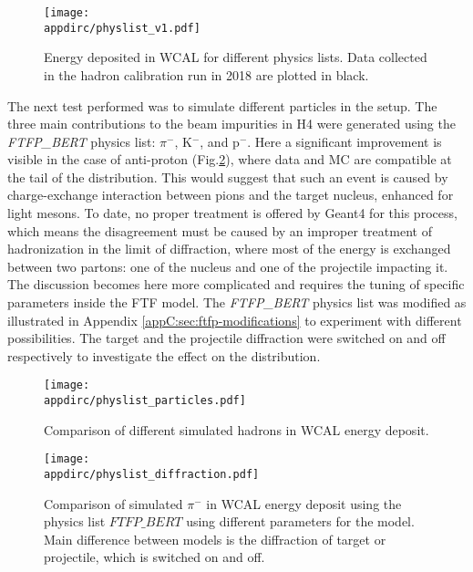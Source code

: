 \begin{figure}[tbh!]
  \centering
  \texttt{[image: \\appdirc/physlist\_v1.pdf]}
  \caption[Comparison of physics list for $\pi^-$ in WCAL energy spectrum]{Energy deposited in WCAL for different physics lists. Data collected in the hadron calibration run in 2018 are plotted in black.}
  \label{fig:geant4-hadron-plist}
\end{figure}

The next test performed was to simulate different particles in the setup. The three main contributions to the beam impurities in H4 were generated using the \textit{FTFP\_BERT} physics list: $\pi^-$, K$^-$, and p$^-$. Here a significant improvement is visible in the case of anti-proton (Fig.\ref{fig:geant4-hadron-particles}), where data and MC are compatible at the tail of the distribution. This would suggest that such an event is caused by charge-exchange interaction between pions and the target nucleus, enhanced for light mesons. To date, no proper treatment is offered by Geant4 for this process, which means the disagreement must be caused by an improper treatment of hadronization in the limit of diffraction, where most of the energy is exchanged between two partons: one of the nucleus and one of the projectile impacting it. The discussion becomes here more complicated and requires the tuning of specific parameters inside the FTF model.  The \textit{FTFP\_BERT} physics list was modified as illustrated in Appendix \ref{appC:sec:ftfp-modifications} to experiment with different possibilities. The target and the projectile diffraction were switched on and off respectively to investigate the effect on the distribution.

\begin{figure}[tbh!]
  \centering
  \texttt{[image: \\appdirc/physlist\_particles.pdf]}
  \caption[Comparison of different simulated hadrons in WCAL energy spectrum]{Comparison of different simulated hadrons in WCAL energy deposit.}
  \label{fig:geant4-hadron-particles}
\end{figure}

\begin{figure}[tbh!]
  \centering
  \texttt{[image: \\appdirc/physlist\_diffraction.pdf]}
  \caption[Comparison of different diffraction limits for hadrons in WCAL energy spectrum]{Comparison of simulated $\pi^-$ in WCAL energy deposit using the physics list $FTFP\_BERT$ using different parameters for the model. Main difference between models is the diffraction of target or projectile, which is switched on and off.}
  \label{fig:geant4-hadron-diff}
\end{figure}

